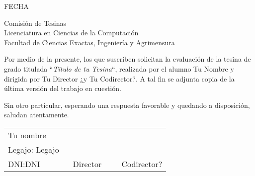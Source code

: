 \documentclass[14pt]{extbook}
\begin{document}
\thispagestyle{empty}
\begin{flushright}
FECHA
\end{flushright}
Comisión de Tesinas
\\
Licenciatura en Ciencias de la Computación
\\
Facultad de Ciencias Exactas, Ingeniería y Agrimensura

\vspace{2em}
Por medio de la presente, los que suscriben solicitan la evaluación de la
tesina de grado titulada
``\textit{Titulo de tu Tesina}``,
realizada por el alumno Tu Nombre y dirigida por Tu Director ¿y
Tu Codirector?. A tal fin se adjunta copia de la última versión
del trabajo en cuestión.

Sin otro particular, esperando una respuesta favorable y quedando a
disposición, saludan atentamente.

\vspace{8cm}
\begin{tabular}{m{0.4\linewidth} m{0.3\linewidth} m{0.3\linewidth}}
Tu nombre\\
Legajo: Legajo\\
DNI:DNI
 &
 Director
 &
 Codirector?
\end{tabular}
\end{document}
